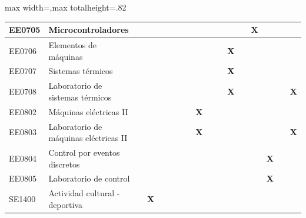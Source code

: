 \begin{center}
\begin{adjustbox}{max width=\textwidth,max totalheight=.82\textheight}
\begin{tabular}{|l|p{4.6cm}|c|c|c|c|c|c|c|c|c|c|c|c|c|c|c|}
EE0705 & Microcontroladores & \textbf{ } & \textbf{ } & \textbf{ } & \textbf{ } & \textbf{ } & \textbf{ } & \textbf{ } & \textbf{ } & \textbf{ } & \textbf{ } & \textbf{ } & \textbf{X} & \textbf{ } & \textbf{ } & \textbf{ } \\ \hline
\rowcolor{azulTabla}
EE0706 & Elementos de máquinas & \textbf{ } & \textbf{ } & \textbf{ } & \textbf{ } & \textbf{ } & \textbf{ } & \textbf{ } & \textbf{ } & \textbf{ } & \textbf{X} & \textbf{ } & \textbf{ } & \textbf{ } & \textbf{ } & \textbf{ } \\ \hline
EE0707 & Sistemas térmicos & \textbf{ } & \textbf{ } & \textbf{ } & \textbf{ } & \textbf{ } & \textbf{ } & \textbf{ } & \textbf{ } & \textbf{ } & \textbf{X} & \textbf{ } & \textbf{ } & \textbf{ } & \textbf{ } & \textbf{ } \\ \hline
\rowcolor{azulTabla}
EE0708 & Laboratorio de sistemas térmicos & \textbf{ } & \textbf{ } & \textbf{ } & \textbf{ } & \textbf{ } & \textbf{ } & \textbf{ } & \textbf{ } & \textbf{ } & \textbf{X} & \textbf{ } & \textbf{ } & \textbf{ } & \textbf{ } & \textbf{X} \\ \hline
EE0802 & Máquinas eléctricas II & \textbf{ } & \textbf{ } & \textbf{ } & \textbf{ } & \textbf{ } & \textbf{ } & \textbf{X} & \textbf{ } & \textbf{ } & \textbf{ } & \textbf{ } & \textbf{ } & \textbf{ } & \textbf{ } & \textbf{ } \\ \hline
\rowcolor{azulTabla}
EE0803 & Laboratorio de máquinas eléctricas II & \textbf{ } & \textbf{ } & \textbf{ } & \textbf{ } & \textbf{ } & \textbf{ } & \textbf{X} & \textbf{ } & \textbf{ } & \textbf{ } & \textbf{ } & \textbf{ } & \textbf{ } & \textbf{ } & \textbf{X} \\ \hline
EE0804 & Control por eventos discretos & \textbf{ } & \textbf{ } & \textbf{ } & \textbf{ } & \textbf{ } & \textbf{ } & \textbf{ } & \textbf{ } & \textbf{ } & \textbf{ } & \textbf{ } & \textbf{ } & \textbf{X} & \textbf{ } & \textbf{ } \\ \hline
\rowcolor{azulTabla}
EE0805 & Laboratorio de control & \textbf{ } & \textbf{ } & \textbf{ } & \textbf{ } & \textbf{ } & \textbf{ } & \textbf{ } & \textbf{ } & \textbf{ } & \textbf{ } & \textbf{ } & \textbf{ } & \textbf{X} & \textbf{ } & \textbf{ } \\ \hline
SE1400 & Actividad cultural - deportiva & \textbf{ } & \textbf{X} & \textbf{ } & \textbf{ } & \textbf{ } & \textbf{ } & \textbf{ } & \textbf{ } & \textbf{ } & \textbf{ } & \textbf{ } & \textbf{ } & \textbf{ } & \textbf{ } & \textbf{ } \\ \hline
\end{tabular}
\end{adjustbox}
\end{center}

